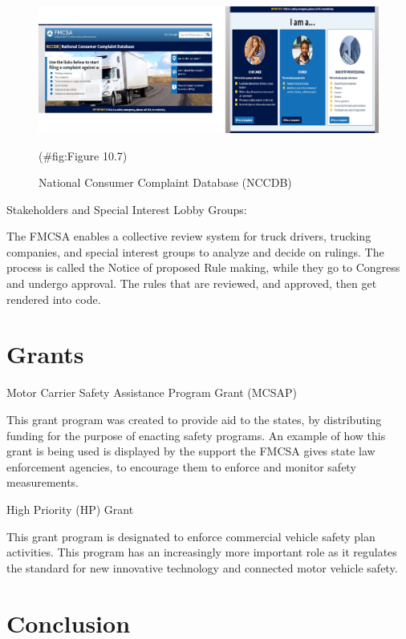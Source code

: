 \documentclass[
]{book}
\begin{document}
\begin{figure}

{\centering \includegraphics{./Images/Enforcement and Safety Organizations/National Consumer Complaint Database (NCCDB)} 

}

\caption{National Consumer Complaint Database (NCCDB)}(\#fig:Figure 10.7)
\end{figure}

Stakeholders and Special Interest Lobby Groups:

The FMCSA enables a collective review system for truck drivers, trucking companies, and special interest groups to analyze and decide on rulings.
The process is called the Notice of proposed Rule making, while they go to Congress and undergo approval.
The rules that are reviewed, and approved, then get rendered into code.

\hypertarget{safety-grants}{%
\section{Grants}\label{safety-grants}}

Motor Carrier Safety Assistance Program Grant
(MCSAP)

This grant program was created to provide aid to the states, by distributing funding for the purpose of enacting safety programs.
An example of how this grant is being used is displayed by the support the FMCSA gives state law enforcement agencies, to encourage them to enforce and monitor safety measurements.

High Priority (HP) Grant

This grant program is designated to enforce commercial vehicle safety plan activities.
This program has an increasingly more important role as it regulates the standard for new innovative technology and connected motor vehicle safety.

\hypertarget{safety-Conclusion}{%
\section{Conclusion}\label{safety-Conclusion}}
\end{document}

